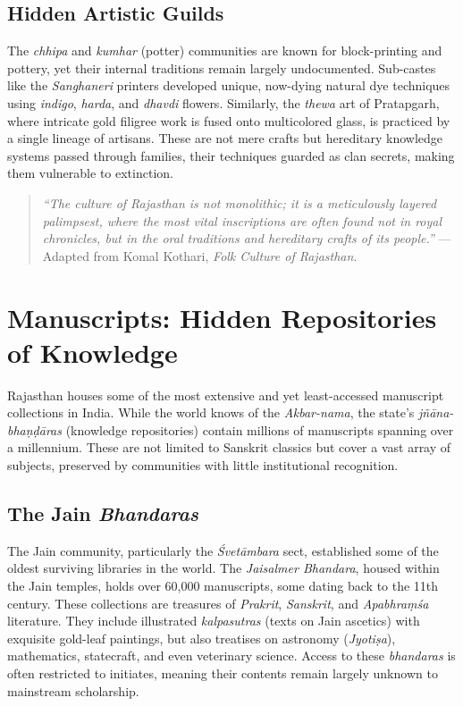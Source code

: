 \documentclass[12pt]{article}
\begin{document}
\subsection{Hidden Artistic Guilds}
The \textit{chhipa} and \textit{kumhar} (potter) communities are known for block-printing and pottery, yet their internal traditions remain largely undocumented. Sub-castes like the \textit{Sanghaneri} printers developed unique, now-dying natural dye techniques using \textit{indigo}, \textit{harda}, and \textit{dhavdi} flowers. Similarly, the \textit{thewa} art of Pratapgarh, where intricate gold filigree work is fused onto multicolored glass, is practiced by a single lineage of artisans. These are not mere crafts but hereditary knowledge systems passed through families, their techniques guarded as clan secrets, making them vulnerable to extinction.

\begin{quote}
\small \textit{“The culture of Rajasthan is not monolithic; it is a meticulously layered palimpsest, where the most vital inscriptions are often found not in royal chronicles, but in the oral traditions and hereditary crafts of its people.”} — Adapted from Komal Kothari, \textit{Folk Culture of Rajasthan}.
\end{quote}

\section{Manuscripts: Hidden Repositories of Knowledge}
Rajasthan houses some of the most extensive and yet least-accessed manuscript collections in India. While the world knows of the \textit{Akbar-nama}, the state’s \textit{jñāna-bhaṇḍāras} (knowledge repositories) contain millions of manuscripts spanning over a millennium. These are not limited to Sanskrit classics but cover a vast array of subjects, preserved by communities with little institutional recognition.

\subsection{The Jain \textit{Bhandaras}}
The Jain community, particularly the \textit{Śvetāmbara} sect, established some of the oldest surviving libraries in the world. The \textit{Jaisalmer Bhandara}, housed within the Jain temples, holds over 60,000 manuscripts, some dating back to the 11th century. These collections are treasures of \textit{Prakrit}, \textit{Sanskrit}, and \textit{Apabhraṃśa} literature. They include illustrated \textit{kalpasutras} (texts on Jain ascetics) with exquisite gold-leaf paintings, but also treatises on astronomy (\textit{Jyotiṣa}), mathematics, statecraft, and even veterinary science. Access to these \textit{bhandaras} is often restricted to initiates, meaning their contents remain largely unknown to mainstream scholarship.
\end{document}
